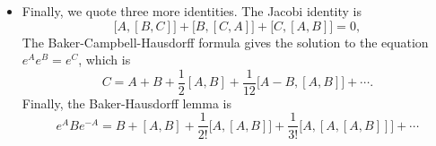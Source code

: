 \documentclass[11pt, a4paper]{article}
\begin{document}
\begin{itemize}
	\item Finally, we quote three more identities. The Jacobi identity is
	\begin{equation*}
		\big[A, [B, C]\big] + \big[B, [C, A]\big] + \big[C, [A, B]\big] = 0,
	\end{equation*}
	The Baker-Campbell-Hausdorff formula gives the solution to the equation $ e^{A}e^{B} = e^{C} $, which is
	\begin{equation*}
		C = A + B + \frac{1}{2}[A, B] + \frac{1}{12}\big[A - B, [A, B]\big] + \cdots.
	\end{equation*}
	Finally, the Baker-Hausdorff lemma is
	\begin{equation*}
		e^{A}Be^{-A} = B + [A, B] + \frac{1}{2!}\big[A, [A, B]\big] + \frac{1}{3!} \big[A, [A, [A, B]]\big] + \cdots
	\end{equation*}
	
\end{itemize}
\end{document}
